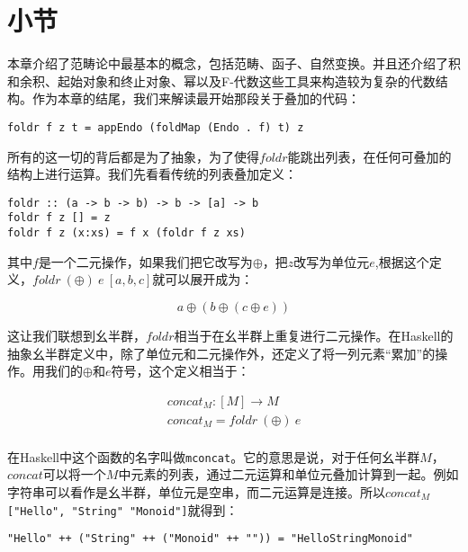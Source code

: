 \documentclass{article}
\begin{document}
\begin{Exercise}
\end{Exercise}

\section{小节}

本章介绍了范畴论中最基本的概念，包括范畴、函子、自然变换。并且还介绍了积和余积、起始对象和终止对象、幂以及F-代数这些工具来构造较为复杂的代数结构。作为本章的结尾，我们来解读最开始那段关于叠加的代码\cite{Haskell-foldable}：

\lstset{frame=single}
\begin{lstlisting}
foldr f z t = appEndo (foldMap (Endo . f) t) z
\end{lstlisting}

所有的这一切的背后都是为了抽象，为了使得$foldr$能跳出列表，在任何可叠加的结构上进行运算。我们先看看传统的列表叠加定义：

\begin{lstlisting}
foldr :: (a -> b -> b) -> b -> [a] -> b
foldr f z [] = z
foldr f z (x:xs) = f x (foldr f z xs)
\end{lstlisting}

其中$f$是一个二元操作，如果我们把它改写为$\oplus$，把$z$改写为单位元$e$,根据这个定义，$foldr\ (\oplus)\ e\ [a, b, c]$就可以展开成为：

\[
a \oplus (b \oplus (c \oplus e))
\]

这让我们联想到幺半群，$foldr$相当于在幺半群上重复进行二元操作。在Haskell的抽象幺半群定义中，除了单位元和二元操作外，还定义了将一列元素“累加”的操作。用我们的$\oplus$和$e$符号，这个定义相当于：

\[
\begin{array}{l}
concat_M : [M] \to M \\
concat_M = foldr\ (\oplus)\ e \\
\end{array}
\]

在Haskell中这个函数的名字叫做\texttt{mconcat}。它的意思是说，对于任何幺半群$M$，$concat$可以将一个$M$中元素的列表，通过二元运算和单位元叠加计算到一起。例如字符串可以看作是幺半群，单位元是空串，而二元运算是连接。所以$concat_M$ \texttt{["Hello", "String" "Monoid"]}就得到：

\begin{verbatim}
"Hello" ++ ("String" ++ ("Monoid" ++ "")) = "HelloStringMonoid"
\end{verbatim}
\end{document}
